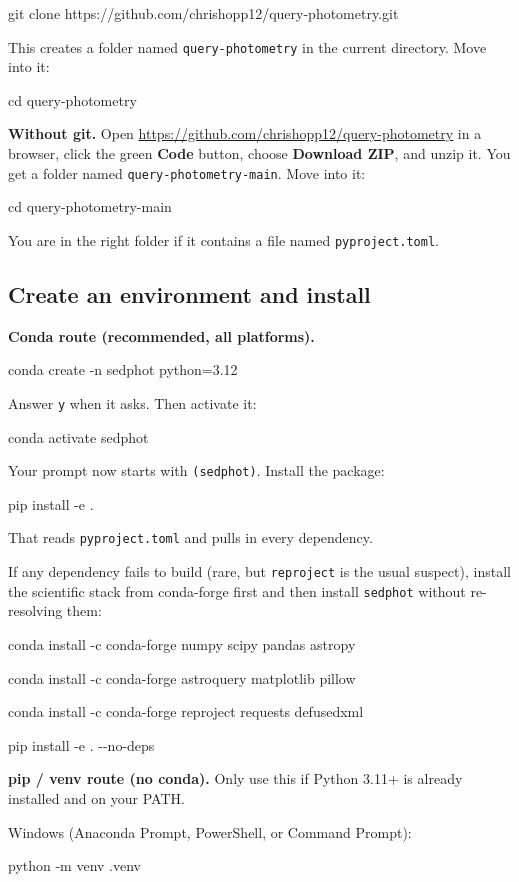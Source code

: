 \documentclass[11pt]{article}
\newcommand{\cmdline}[1]{\begin{cmd}\ttfamily #1\end{cmd}}
\begin{document}
\cmdline{git clone https://github.com/chrishopp12/query-photometry.git}

This creates a folder named \texttt{query-photometry} in the current
directory. Move into it:

\cmdline{cd query-photometry}

\textbf{Without git.} Open
\url{https://github.com/chrishopp12/query-photometry} in a browser, click
the green \textbf{Code} button, choose \textbf{Download ZIP}, and unzip
it. You get a folder named \texttt{query-photometry-main}. Move into it:

\cmdline{cd query-photometry-main}

You are in the right folder if it contains a file named
\texttt{pyproject.toml}.

\subsection{Create an environment and install}

\textbf{Conda route (recommended, all platforms).}

\cmdline{conda create -n sedphot python=3.12}

Answer \texttt{y} when it asks. Then activate it:

\cmdline{conda activate sedphot}

Your prompt now starts with \texttt{(sedphot)}. Install the package:

\cmdline{pip install -e .}

That reads \texttt{pyproject.toml} and pulls in every dependency.

If any dependency fails to build (rare, but \texttt{reproject} is the
usual suspect), install the scientific stack from conda-forge first and
then install \texttt{sedphot} without re-resolving them:

\cmdline{conda install -c conda-forge numpy scipy pandas astropy}

\cmdline{conda install -c conda-forge astroquery matplotlib pillow}

\cmdline{conda install -c conda-forge reproject requests defusedxml}

\cmdline{\frenchspacing pip install -e . -{}-no-deps}

\textbf{pip / venv route (no conda).} Only use this if Python 3.11+ is
already installed and on your PATH.

Windows (Anaconda Prompt, PowerShell, or Command Prompt):

\cmdline{python -m venv .venv}
\end{document}
